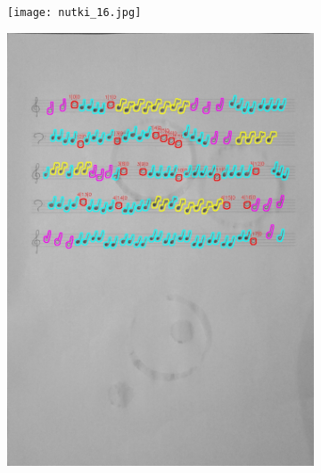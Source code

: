 \documentclass[11pt]{article}
\begin{document}
\begin{figure}[H]
    \centering
    \begin{subfigure}{.5\textwidth}
        \centering
        \graphicspath{ {Resources/} }
        \texttt{[image: nutki\_16.jpg]}
        \label{fig:sub1}
    \end{subfigure}%
    \begin{subfigure}{.5\textwidth}
        \centering
        \graphicspath{ {blobs/} }
        \includegraphics[width=\linewidth]{16_cnts.jpg}
        \label{fig:sub2}
    \end{subfigure}
    \label{fig:test}
\end{figure}
\end{document}

